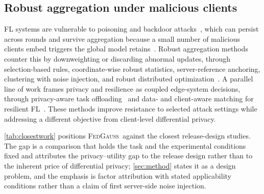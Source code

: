 \documentclass[a4paper,fleqn]{cas-dc}
\newcommand{\method}{\textsc{FedGauss}}
\begin{document}
\subsection{Robust aggregation under malicious clients}
\par
FL systems are vulnerable to poisoning and backdoor attacks~\cite{bagdasaryan2020backdoor,xie2020dba,fang2023backdoor,fan2025fedshelter}, which can persist across rounds and survive aggregation because a small number of malicious clients embed triggers the global model retains~\cite{bagdasaryan2020backdoor,xie2020dba}. Robust aggregation methods counter this by downweighting or discarding abnormal updates, through selection-based rules, coordinate-wise robust statistics, server-reference anchoring, clustering with noise injection, and robust distributed optimization~\cite{blanchard2017krum,yin2018byzantine,cao2021fltrust,nguyen2022flame,pillutla2022robust}. A parallel line of work frames privacy and resilience as coupled edge-system decisions, through privacy-aware task offloading~\cite{li2026fh} and data- and client-aware matching for resilient FL~\cite{umar2026matching}. These methods improve resistance to selected attack settings while addressing a different objective from client-level differential privacy.
\par
\cref{tab:closestwork} positions \method\ against the closest release-design studies. The gap is a comparison that holds the task and the experimental conditions fixed and attributes the privacy--utility gap to the release design rather than to the inherent price of differential privacy; \cref{sec:method} states it as a design problem, and the emphasis is factor attribution with stated applicability conditions rather than a claim of first server-side noise injection.
\par
\par
\par
\end{document}
